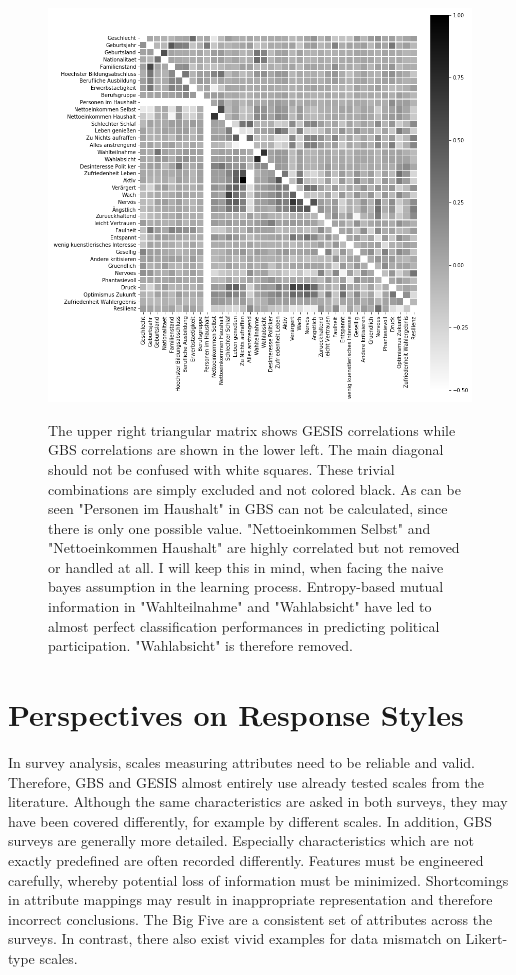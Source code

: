 \begin{figure}[ht]
	\begin{center}
		\includegraphics[scale=0.73,angle=0]{fig/correl}
		\label{corr}
		\caption{The upper right triangular matrix shows GESIS correlations while GBS correlations are shown in the lower left. The main diagonal should not be confused with white squares. These trivial combinations are simply excluded and not colored black. As can be seen "Personen im Haushalt" in GBS can not be calculated, since there is only one possible value. "Nettoeinkommen Selbst" and "Nettoeinkommen Haushalt" are highly correlated but not removed or handled at all. I will keep this in mind, when facing the naive bayes assumption in the learning process. Entropy-based mutual information in "Wahlteilnahme" and "Wahlabsicht" have led to almost perfect classification performances in predicting political participation. "Wahlabsicht" is therefore removed.}
	\end{center}
\end{figure}

\section{Perspectives on Response Styles}

In survey analysis, scales measuring attributes need to be reliable and valid. Therefore, GBS and GESIS almost entirely use already tested scales from the literature. Although the same characteristics are asked in both surveys, they may have been covered differently, for example by different scales. In addition, GBS surveys are generally more detailed. Especially characteristics which are not exactly predefined are often recorded differently. Features must be engineered carefully, whereby potential loss of information must be minimized. Shortcomings in attribute mappings may result in inappropriate representation and therefore incorrect conclusions. The Big Five are a consistent set of attributes across the surveys. In contrast, there also exist vivid examples for data mismatch on Likert-type scales.

